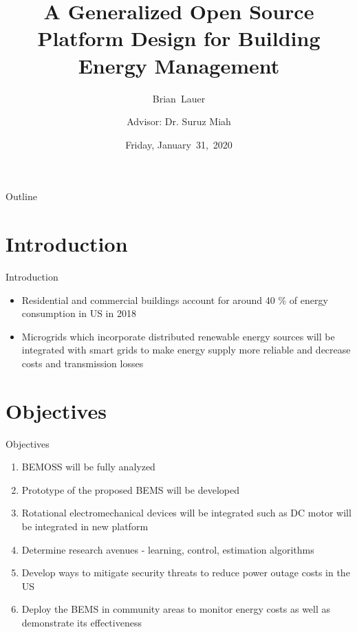 \documentclass{beamer}
\title[]{A Generalized Open Source Platform Design for Building Energy Management}
\author[B.~Lauer]{Brian~Lauer\\\and
Advisor: Dr. Suruz Miah}
\institute[Bradley University] %
{
  Department of Electrical and Computer Engineering\\
  Bradley University\\
  1501 W. Bradley Avenue\\
  Peoria, IL, 61625, USA
}
\date[Friday~31,~2020]{Friday, January~31,~2020}
\begin{document}
\begin{frame}
  \titlepage
\end{frame}

\begin{frame}{Outline}
  \tableofcontents
\end{frame}

\section{Introduction}

\begin{frame}{Introduction}{}
  	\begin{itemize}
  		\item Residential and commercial buildings account for around 40 \% of energy consumption in US in 2018
  		\item Microgrids which incorporate distributed renewable energy sources will be integrated with smart grids to make energy supply more reliable and decrease costs and transmission losses
  	\end{itemize}
\end{frame}

\section{Objectives}
\begin{frame}{Objectives}
\begin{enumerate}
\item BEMOSS will be fully analyzed 
\item Prototype of the proposed BEMS will be developed
\item Rotational electromechanical devices will be integrated such as DC motor will be integrated in new platform
\item Determine research avenues - learning, control, estimation algorithms
\item Develop ways to mitigate security threats to reduce power outage costs in the US
\item Deploy the BEMS in community areas to monitor energy costs as well as demonstrate its effectiveness
\end{enumerate}
\end{frame}
\end{document}
